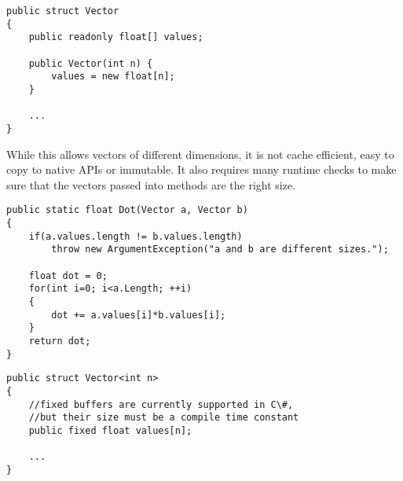 \begin{lstlisting}[caption={Vector using CLI array}, keywordstyle={\color{blue}},language=sharpc]
public struct Vector
{
	public readonly float[] values;
	
	public Vector(int n) {
		values = new float[n];
	}
	
	...
}
\end{lstlisting}

While this allows vectors of different dimensions, it is not cache efficient, easy to copy to native APIs or immutable.
It also requires many runtime checks to make sure that the vectors passed into methods are the right size.

\begin{lstlisting}[caption={Runtime checks needed when using arrays}, keywordstyle={\color{blue}},language=sharpc]
public static float Dot(Vector a, Vector b)
{
	if(a.values.length != b.values.length)
		throw new ArgumentException("a and b are different sizes.");
		
	float dot = 0;
	for(int i=0; i<a.Length; ++i)
	{
		dot += a.values[i]*b.values[i];
	}
	return dot;
}
\end{lstlisting}


\begin{lstlisting}[caption={A fixed size vector type}, keywordstyle={\color{blue}},language=sharpc]
public struct Vector<int n>
{
	//fixed buffers are currently supported in C\#,
	//but their size must be a compile time constant
	public fixed float values[n]; 
	
	...
}
\end{lstlisting}
